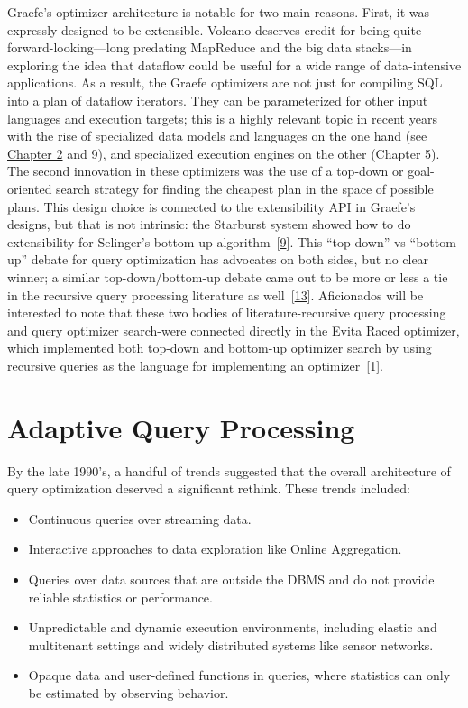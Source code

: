\documentclass[b5paper,11pt,twoside,openright]{book}
\newcommand\Section[2]{
  \hypertarget{#1}{
    \section{#2}\label{#1}
  }
}
\begin{document}
Graefe's optimizer architecture is notable for two main reasons. First,
it was expressly designed to be extensible. Volcano deserves credit for
being quite forward-looking---long predating MapReduce and the big data
stacks---in exploring the idea that dataflow could be useful for a wide
range of data-intensive applications. As a result, the Graefe optimizers
are not just for compiling SQL into a plan of dataflow iterators. They
can be parameterized for other input languages and execution targets;
this is a highly relevant topic in recent years with the rise of
specialized data models and languages on the one hand (see
\hyperref[ch2-importantdbms]{Chapter 2} and 9), and specialized
execution engines on the other (Chapter 5). The second innovation in
these optimizers was the use of a top-down or goal-oriented search
strategy for finding the cheapest plan in the space of possible plans.
This design choice is connected to the extensibility API in Graefe's
designs, but that is not intrinsic: the Starburst system showed how to
do extensibility for Selinger's bottom-up
algorithm~{{[}\protect\hyperlink{ref-lohman1988grammar}{9}{]}}. This
``top-down'' vs ``bottom-up'' debate for query optimization has
advocates on both sides, but no clear winner; a similar
top-down/bottom-up debate came out to be more or less a tie in the
recursive query processing literature as
well~{{[}\protect\hyperlink{ref-ramakrishnan1991top}{13}{]}}.
Aficionados will be interested to note that these two bodies of
literature-recursive query processing and query optimizer search-were
connected directly in the Evita Raced optimizer, which implemented both
top-down and bottom-up optimizer search by using recursive queries as
the language for implementing an
optimizer~{{[}\protect\hyperlink{ref-condie2008evita}{1}{]}}.

\Section{adaptive-query-processing}{%
Adaptive Query Processing
}

By the late 1990's, a handful of trends suggested that the overall
architecture of query optimization deserved a significant rethink. These
trends included:

\begin{itemize}
  \item
  Continuous queries over streaming data.
  \item
  Interactive approaches to data exploration like Online Aggregation.
  \item
  Queries over data sources that are outside the DBMS and do not provide
  reliable statistics or performance.
  \item
  Unpredictable and dynamic execution environments, including elastic
  and multitenant settings and widely distributed systems like sensor
  networks.
  \item
  Opaque data and user-defined functions in queries, where statistics
  can only be estimated by observing behavior.
\end{itemize}
\end{document}
